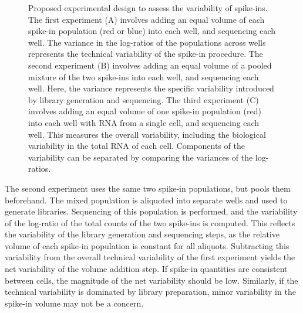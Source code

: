 \documentclass{article}
\begin{document}

\begin{figure}[H]
\begin{center}
\end{center}
\caption{Proposed experimental design to assess the variability of spike-ins.
The first experiment (A) involves adding an equal volume of each spike-in population (red or blue) into each well, and sequencing each well.
The variance in the log-ratios of the populations across wells represents the technical variability of the spike-in procedure.
The second experiment (B) involves adding an equal volume of a pooled mixture of the two spike-ins into each well, and sequencing each well.
Here, the variance represents the specific variability introduced by library generation and sequencing.
The third experiment (C) involves adding an equal volume of one spike-in population (red) into each well with RNA from a single cell, and sequencing each well.
This measures the overall variability, including the biological variability in the total RNA of each cell.
Components of the variability can be separated by comparing the variances of the log-ratios.
}
\label{fig:expdesign}
\end{figure}

The second experiment uses the same two spike-in populations, but pools them beforehand.
The mixed population is aliquoted into separate wells and used to generate libraries.
Sequencing of this population is performed, and the variability of the log-ratio of the total counts of the two spike-ins is computed.
This reflects the variability of the library generation and sequencing steps, as the relative volume of each spike-in population is constant for all aliquots.
Subtracting this variability from the overall technical variability of the first experiment yields the net variability of the volume addition step.
If spike-in quantities are consistent between cells, the magnitude of the net variability should be low.
Similarly, if the technical variability is dominated by library preparation, minor variability in the spike-in volume may not be a concern.
\end{document}
